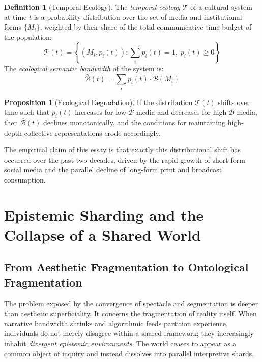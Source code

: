 \documentclass[12pt]{article}
\theoremstyle{definition}
\newtheorem{definition}{Definition}[section]
\newtheorem{proposition}{Proposition}[section]
\theoremstyle{plain}
\begin{document}
\begin{definition}[Temporal Ecology]
The \emph{temporal ecology} $\mathcal{T}$ of a cultural system at time $t$ is a probability distribution over the set of media and institutional forms $\{M_i\}$, weighted by their share of the total communicative time budget of the population:
\begin{equation}
\mathcal{T}(t) = \left\{ (M_i, p_i(t)) : \sum_i p_i(t) = 1,\; p_i(t) \geq 0 \right\}
\end{equation}
The \emph{ecological semantic bandwidth} of the system is:
\begin{equation}
\overline{\mathcal{B}}(t) = \sum_i p_i(t) \cdot \mathcal{B}(M_i)
\end{equation}
\end{definition}

\begin{proposition}[Ecological Degradation]
If the distribution $\mathcal{T}(t)$ shifts over time such that $p_i(t)$ increases for low-$\mathcal{B}$ media and decreases for high-$\mathcal{B}$ media, then $\overline{\mathcal{B}}(t)$ declines monotonically, and the conditions for maintaining high-depth collective representations erode accordingly.
\end{proposition}

The empirical claim of this essay is that exactly this distributional shift has occurred over the past two decades, driven by the rapid growth of short-form social media and the parallel decline of long-form print and broadcast consumption.

\section{Epistemic Sharding and the Collapse of a Shared World}
\label{sec:sharding}

\subsection{From Aesthetic Fragmentation to Ontological Fragmentation}

The problem exposed by the convergence of spectacle and segmentation is deeper than aesthetic superficiality. It concerns the fragmentation of reality itself. When narrative bandwidth shrinks and algorithmic feeds partition experience, individuals do not merely disagree within a shared framework; they increasingly inhabit \emph{divergent epistemic environments}. The world ceases to appear as a common object of inquiry and instead dissolves into parallel interpretive shards.
\end{document}
